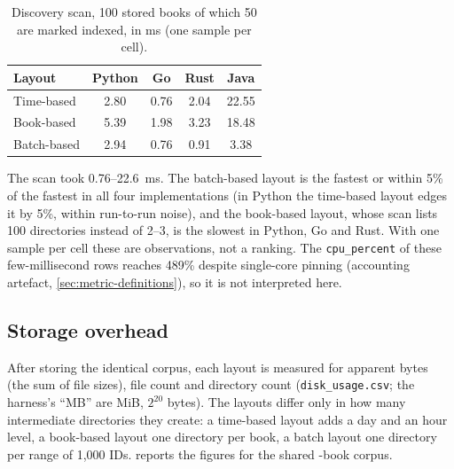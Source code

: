 \begin{table}[htbp]
    \centering
    \caption{Discovery scan, 100 stored books of which 50 are marked
    indexed, in ms (one sample per cell).}
    \label{tab:discovery}
    \begin{tabular}{@{}lcccc@{}}
        \toprule
        Layout & Python & Go & Rust & Java \\
        \midrule
        Time-based & 2.80 & 0.76 & 2.04 & 22.55 \\
        Book-based & 5.39 & 1.98 & 3.23 & 18.48 \\
        Batch-based & 2.94 & 0.76 & 0.91 & 3.38 \\
        \bottomrule
    \end{tabular}
\end{table}

The scan took 0.76--22.6~ms. The batch-based layout is the fastest or
within 5\% of the fastest in all four implementations (in Python the
time-based layout edges it by 5\%, within run-to-run noise), and the
book-based layout, whose scan lists 100 directories instead of 2--3, is
the slowest in Python, Go and Rust. With one sample per cell these are
observations, not a ranking. The \texttt{cpu\_percent} of these
few-millisecond rows reaches 489\% despite single-core pinning (accounting
artefact, \cref{sec:metric-definitions}), so it is not interpreted here.

\subsection{Storage overhead}
\label{sec:datalake-storage}

After storing the identical corpus, each layout is measured for apparent
bytes (the sum of file sizes), file count and directory count
(\texttt{disk\_usage.csv}; the harness's ``MB'' are MiB, $2^{20}$ bytes).
The layouts differ only in how many intermediate directories they create: a
time-based layout adds a day and an hour level, a book-based layout one
directory per book, a batch layout one directory per range of 1{,}000 IDs.
 reports the figures for the shared
-book corpus.

